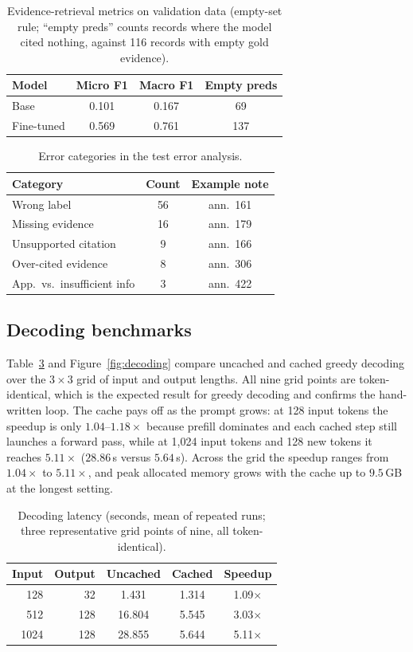 \documentclass[conference]{IEEEtran}
\begin{document}
\begin{table}[t]
\centering
\caption{Evidence-retrieval metrics on validation data (empty-set rule; ``empty preds'' counts
records where the model cited nothing, against 116 records with empty gold evidence).}
\label{tab:evidence}
\begin{tabular}{lccc}
\toprule
Model & Micro F1 & Macro F1 & Empty preds \\
\midrule
Base & 0.101 & 0.167 & 69 \\
Fine-tuned & 0.569 & 0.761 & 137 \\
\bottomrule
\end{tabular}
\end{table}

\begin{table}[t]
\centering
\caption{Error categories in the test error analysis.}
\label{tab:errors}
\begin{tabular}{lcc}
\toprule
Category & Count & Example note \\
\midrule
Wrong label & 56 & ann.\ 161 \\
Missing evidence & 16 & ann.\ 179 \\
Unsupported citation & 9 & ann.\ 166 \\
Over-cited evidence & 8 & ann.\ 306 \\
App.\ vs.\ insufficient info & 3 & ann.\ 422 \\
\bottomrule
\end{tabular}
\end{table}

\subsection{Decoding benchmarks}
Table~\ref{tab:decoding} and Figure~\ref{fig:decoding} compare uncached and cached greedy decoding
over the $3\times3$ grid of input and output lengths. All nine grid points are token-identical, which
is the expected result for greedy decoding and confirms the hand-written loop. The cache pays off as
the prompt grows: at 128 input tokens the speedup is only $1.04$--$1.18\times$ because prefill
dominates and each cached step still launches a forward pass, while at 1{,}024 input tokens and 128
new tokens it reaches $5.11\times$ ($28.86$\,s versus $5.64$\,s). Across the grid the speedup ranges
from $1.04\times$ to $5.11\times$, and peak allocated memory grows with the cache up to $9.5$\,GB at
the longest setting.

\begin{table}[t]
\centering
\caption{Decoding latency (seconds, mean of repeated runs; three representative grid points of
nine, all token-identical).}
\label{tab:decoding}
\begin{tabular}{rrccc}
\toprule
Input & Output & Uncached & Cached & Speedup \\
\midrule
128 & 32 & 1.431 & 1.314 & 1.09$\times$ \\
512 & 128 & 16.804 & 5.545 & 3.03$\times$ \\
1024 & 128 & 28.855 & 5.644 & 5.11$\times$ \\
\bottomrule
\end{tabular}
\end{table}
\end{document}
